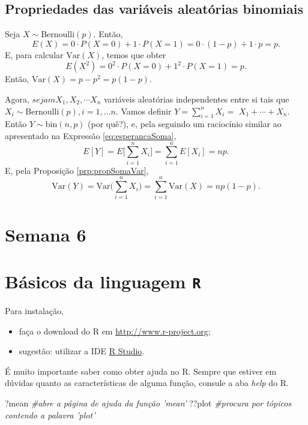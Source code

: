 \documentclass[]{book}
\newenvironment{Shaded}{\begin{snugshade}}{\end{snugshade}}
\newcommand{\CommentTok}[1]{\textcolor[rgb]{0.56,0.35,0.01}{\textit{#1}}}
\newcommand{\NormalTok}[1]{#1}
\theoremstyle{definition}
\theoremstyle{definition}
\theoremstyle{definition}
\theoremstyle{remark}
\begin{document}
\hypertarget{propriedades-das-variuxe1veis-aleatuxf3rias-binomiais-1}{%
\section{Propriedades das variáveis aleatórias binomiais}\label{propriedades-das-variuxe1veis-aleatuxf3rias-binomiais-1}}

Seja \(X\sim\mathrm{Bernoulli}(p)\).
Então, \[E(X) = 0\cdot P(X=0)+1\cdot P(X=1)=0\cdot (1-p) + 1\cdot p = p.\]
E, para calcular \(\mathrm{Var}(X)\), temos que obter
\[E(X^2)=0^2\cdot P(X=0)+1^2\cdot P(X=1)= p.\]
Então, \(\mathrm{Var}(X)=p - p^2=p(1-p).\)

Agora, \(sejam X_1, X_2, \cdots X_n\) variáveis aleatórias independentes entre si tais que \(X_i \sim\mathrm{Bernoulli}(p), i=1,\ldots n.\)
Vamos definir \(Y = \sum_{i=1}^{n}X_i =\) \(X_1 + \cdots + X_n.\)
Então \(Y\sim\mathrm{bin}(n,p)\) (por quê?), e, pela seguindo um raciocínio similar ao apresentado na Expressão \eqref{eq:esperancaSoma},
\[E[Y] = E\bigg[ \sum_{i=1}^{n}X_i \bigg] = \sum_{i=1}^{n}E[X_i]=n p.\]
E, pela Proposição \ref{prp:propSomaVar},
\[\mathrm{Var}(Y) = \mathrm{Var}\bigg(\sum_{i=1}^{n}X_i \bigg)=\sum_{i=1}^{n}\mathrm{Var}(X)=np(1-p).\]

\hypertarget{sem6}{%
\chapter{Semana 6}\label{sem6}}

\hypertarget{appendix-appendice}{%
\appendix}


\hypertarget{S:apendiceR}{%
\chapter{\texorpdfstring{Básicos da linguagem \texttt{R}}{Básicos da linguagem R}}\label{S:apendiceR}}

Para instalação,

\begin{itemize}
\item
  faça o download do R em \url{http://www.r-project.org};
\item
  sugestão: utilizar a IDE \href{http://www.rstudio.org}{R Studio}.
\end{itemize}

É muito importante saber como obter ajuda no R.
Sempre que estiver em dúvidas quanto as características de alguma função, consule a aba \emph{help} do R.

\begin{Shaded}
\begin{Highlighting}[]
\NormalTok{?mean }\CommentTok{#abre a página de ajuda da função 'mean'}
\NormalTok{??plot }\CommentTok{#procura por tópicos contendo a palavra 'plot'}
\end{Highlighting}
\end{Shaded}
\end{document}
